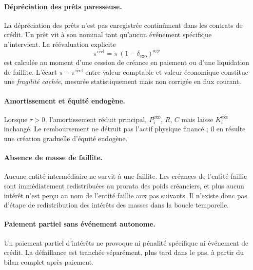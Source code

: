 \documentclass[11pt,a4paper]{article}
\begin{document}
\paragraph{Dépréciation des prêts paresseuse.} La dépréciation des prêts n'est pas enregistrée continûment dans les contrats de crédit. Un prêt vit à son nominal tant qu'aucun événement spécifique n'intervient. La réévaluation explicite
\[
\pi^{\mathrm{r\acute eel}} = \pi\,(1-\delta_{\mathrm{exo}})^{\mathrm{age}}
\]
est calculée au moment d'une cession de créance en paiement ou d'une liquidation de faillite. L'écart \(\pi - \pi^{\mathrm{r\acute eel}}\) entre valeur comptable et valeur économique constitue une \emph{fragilité cachée}, mesurée statistiquement mais non corrigée en flux courant.

\paragraph{Amortissement et équité endogène.} Lorsque \(\tau>0\), l'amortissement réduit \(\text{principal}\), \(P_i^{\mathrm{exo}}\), \(R\), \(C\) mais laisse \(K_i^{\mathrm{exo}}\) inchangé. Le remboursement ne détruit pas l'actif physique financé ; il en résulte une création graduelle d'équité endogène.

\paragraph{Absence de masse de faillite.} Aucune entité intermédiaire ne survit à une faillite. Les créances de l'entité faillie sont immédiatement redistribuées au prorata des poids créanciers, et plus aucun intérêt n'est perçu au nom de l'entité faillie aux pas suivants. Il n'existe donc pas d'étape de \og redistribution des intérêts des masses \fg{} dans la boucle temporelle.

\paragraph{Paiement partiel sans événement autonome.} Un paiement partiel d'intérêts ne provoque ni pénalité spécifique ni événement de crédit. La défaillance est tranchée séparément, plus tard dans le pas, à partir du bilan complet après paiement.
\end{document}
